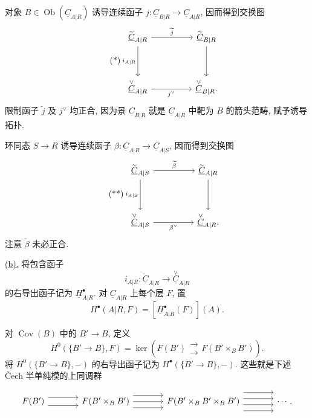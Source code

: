 
对象 $B\in\operatorname{Ob}(\underline C_{A|R})$ 诱导连续函子
$j:\underline C_{B|R}\longrightarrow\underline C_{A|R}$, 因而得到交换图
\begin{equation}\tag{*}
\begin{tikzcd}[column sep=huge,row sep=huge]
 \widetilde{\underline C}_{A|R}
   \arrow[r,"\widetilde j"] \arrow[d,"i_{A|R}"']
 & \widetilde{\underline C}_{B|R} \arrow[d] \\
 \overset{\vee}{\underline C}_{A|R}
   \arrow[r,"j^{\vee}"']
 & \overset{\vee}{\underline C}_{B|R}.
\end{tikzcd}
\end{equation}
限制函子 $\widetilde j$ 及 $j^{\vee}$ 均正合,
因为景 $\underline C_{B|R}$ 就是 $\underline C_{A|R}$
中靶为 $B$ 的箭头范畴, 赋予诱导拓扑.

环同态 $S\longrightarrow R$ 诱导连续函子
$\beta:\underline C_{A|R}\longrightarrow\underline C_{A|S}$,
因而得到交换图
\begin{equation}\tag{**}
\begin{tikzcd}[column sep=huge,row sep=huge]
 \widetilde{\underline C}_{A|S}
   \arrow[r,"\widetilde\beta"] \arrow[d,"i_{A|S}"']
 & \widetilde{\underline C}_{A|R} \arrow[d] \\
 \overset{\vee}{\underline C}_{A|S}
   \arrow[r,"\beta^{\vee}"']
 & \overset{\vee}{\underline C}_{A|R}.
\end{tikzcd}
\end{equation}
注意 $\widetilde\beta$ 未必正合.

\underline{(b).}
将包含函子
\[
 i_{A|R}:\widetilde{\underline C}_{A|R}
 \longrightarrow\overset{\vee}{\underline C}_{A|R}
\]
的右导出函子记为 $\underline H^{\bullet}_{A|R}$.
对 $\underline C_{A|R}$ 上每个层 $F$, 置
\[
 H^{\bullet}(A|R,F)=
 [\underline H^{\bullet}_{A|R}(F)](A).
\]

对 $\operatorname{Cov}(B)$ 中的 $B'\longrightarrow B$, 定义
\[
 H^0(\{B'\longrightarrow B\},F)=
 \ker\!\left(
 F(B')\mathrel{\substack{\longrightarrow\\[-.6ex]\longrightarrow}}
 F(B'\mathbin{\times_B}B')
 \right).
\]
将 $H^0(\{B'\longrightarrow B\},-)$ 的右导出函子记为
$H^{\bullet}(\{B'\longrightarrow B\},-)$.
这些就是下述 \v{C}ech 半单纯模的上同调群


\[
\begin{tikzcd}[column sep=large]
 F(B')
   \arrow[r,shift left=2] \arrow[r,shift right=2]
 & F(B'\times_BB')
   \arrow[r,shift left=3] \arrow[r] \arrow[r,shift right=3]
 & F(B'\times_BB'\times_BB')
   \arrow[r,shift left=4.5] \arrow[r,shift left=1.5]
   \arrow[r,shift right=1.5] \arrow[r,shift right=4.5]
 & \cdots .
\end{tikzcd}
\]

